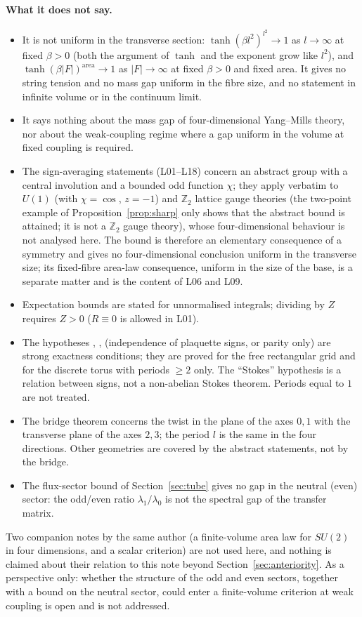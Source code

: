\documentclass[11pt,a4paper]{article}
\theoremstyle{plain}
\theoremstyle{definition}
\theoremstyle{remark}
\numberwithin{equation}{section}
\newcommand{\lean}[1]{\texttt{\expandafter\leanbk\detokenize{#1}\relax}}
\def\leanbk#1{\ifx#1\relax\else\ifx#1.#1\allowbreak\else\ifx#1_#1\allowbreak\else#1\fi\fi\expandafter\leanbk\fi}
\begin{document}
\paragraph{What it does not say.}
\begin{itemize}
\item It is not uniform in the transverse section: $\tanh(\beta l^2)^{l^2}\to1$ as $l\to\infty$ at fixed $\beta>0$ (both the argument of $\tanh$ and the exponent grow like $l^2$), and $\tanh(\beta|F|)^{\mathrm{area}}\to1$ as $|F|\to\infty$ at fixed $\beta>0$ and fixed area. It gives no string tension and no mass gap uniform in the fibre size, and no statement in infinite volume or in the continuum limit.
\item It says nothing about the mass gap of four-dimensional Yang--Mills theory, nor about the weak-coupling regime where a gap uniform in the volume at fixed coupling is required.
\item The sign-averaging statements (L01--L18) concern an abstract group with a central involution and a bounded odd function $\chi$; they apply verbatim to $U(1)$ (with $\chi=\cos$, $z=-1$) and $\mathbb Z_2$ lattice gauge theories (the two-point example of Proposition~\ref{prop:sharp} only shows that the abstract bound is attained; it is not a $\mathbb Z_2$ gauge theory), whose four-dimensional behaviour is not analysed here. The bound is therefore an elementary consequence of a symmetry and gives no four-dimensional conclusion uniform in the transverse size; its fixed-fibre area-law consequence, uniform in the size of the base, is a separate matter and is the content of L06 and L09.
\item Expectation bounds are stated for unnormalised integrals; dividing by $Z$ requires $Z>0$ ($R\equiv0$ is allowed in L01).
\item The hypotheses \lean{hsurj}, \lean{hpar}, \lean{himg} (independence of plaquette signs, or parity only) are strong exactness conditions; they are proved for the free rectangular grid and for the discrete torus with periods $\ge2$ only. The ``Stokes'' hypothesis is a relation between signs, not a non-abelian Stokes theorem. Periods equal to $1$ are not treated.
\item The bridge theorem concerns the twist in the plane of the axes $0,1$ with the transverse plane of the axes $2,3$; the period $l$ is the same in the four directions. Other geometries are covered by the abstract statements, not by the bridge.
\item The flux-sector bound of Section~\ref{sec:tube} gives no gap in the neutral (even) sector: the odd/even ratio $\lambda_1/\lambda_0$ is not the spectral gap of the transfer matrix.
\end{itemize}
Two companion notes by the same author (a finite-volume area law for $SU(2)$ in four dimensions, and a scalar criterion) are not used here, and nothing is claimed about their relation to this note beyond Section~\ref{sec:anteriority}. As a perspective only: whether the structure of the odd and even sectors, together with a bound on the neutral sector, could enter a finite-volume criterion at weak coupling is open and is not addressed.
\end{document}
